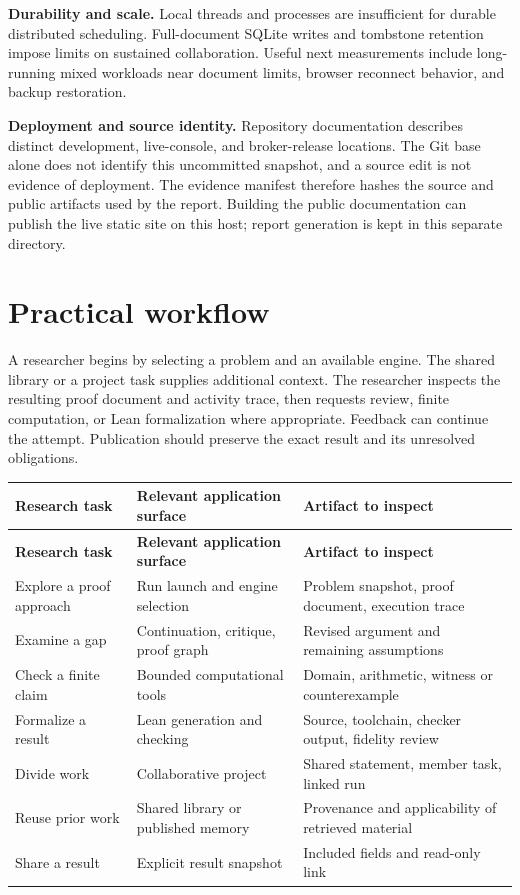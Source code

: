 \documentclass[10pt,letterpaper]{article}
\begin{document}
\textbf{Durability and scale.} Local threads and processes are insufficient for durable distributed scheduling. Full-document SQLite writes and tombstone retention impose limits on sustained collaboration. Useful next measurements include long-running mixed workloads near document limits, browser reconnect behavior, and backup restoration.

\textbf{Deployment and source identity.} Repository documentation describes distinct development, live-console, and broker-release locations. The Git base alone does not identify this uncommitted snapshot, and a source edit is not evidence of deployment. The evidence manifest therefore hashes the source and public artifacts used by the report. Building the public documentation can publish the live static site on this host; report generation is kept in this separate directory.

\section{Practical workflow}

A researcher begins by selecting a problem and an available engine. The shared library or a project task supplies additional context. The researcher inspects the resulting proof document and activity trace, then requests review, finite computation, or Lean formalization where appropriate. Feedback can continue the attempt. Publication should preserve the exact result and its unresolved obligations.

\begingroup\small
\setlength{\tabcolsep}{4pt}
\begin{longtable}{>{\raggedright\arraybackslash}p{0.23\dimexpr\linewidth-6\tabcolsep\relax}>{\raggedright\arraybackslash}p{0.38\dimexpr\linewidth-6\tabcolsep\relax}>{\raggedright\arraybackslash}p{0.39\dimexpr\linewidth-6\tabcolsep\relax}}
\toprule
\textbf{Research task} & \textbf{Relevant application surface} & \textbf{Artifact to inspect} \\
\midrule\endfirsthead
\toprule
\textbf{Research task} & \textbf{Relevant application surface} & \textbf{Artifact to inspect} \\
\midrule\endhead
\bottomrule\endfoot
Explore a proof approach & Run launch and engine selection & Problem snapshot, proof document, execution trace \\
Examine a gap & Continuation, critique, proof graph & Revised argument and remaining assumptions \\
Check a finite claim & Bounded computational tools & Domain, arithmetic, witness or counterexample \\
Formalize a result & Lean generation and checking & Source, toolchain, checker output, fidelity review \\
Divide work & Collaborative project & Shared statement, member task, linked run \\
Reuse prior work & Shared library or published memory & Provenance and applicability of retrieved material \\
Share a result & Explicit result snapshot & Included fields and read-only link \\
\end{longtable}
\endgroup
\end{document}
